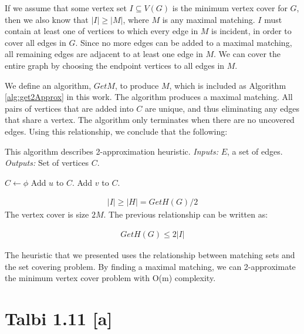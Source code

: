 \documentclass[12pt]{article}
\begin{document}
If we assume that some vertex set $I \subseteq V(G)$ is the minimum vertex cover for $G$, then we also know that $|I| \geq |M|$, where $M$ is any maximal matching. $I$ must contain at least one of vertices to which every edge in $M$ is incident, in order to cover all edges in $G$. Since no more edges can be added to a maximal matching, all remaining edges are adjacent to at least one edge in $M$. We can cover the entire graph by choosing the endpoint vertices to all edges in $M$.

We define an algorithm, $GetM$, to produce $M$, which is included as Algorithm \ref{alg:get2Approx} in this work. The algorithm produces a maximal matching. All pairs of vertices that are added into $C$ are unique, and thus eliminating any edges that share a vertex. The algorithm only terminates when there are no uncovered edges. Using this relationship, we conclude that the following:


\begin{algorithm}[ht!]
	\caption{This algorithm describes 2-approximation heuristic. \textit{Inputs:} $E$, a set of edges.
		\textit{Outputs:} Set of vertices $C$.} 
	\begin{algorithmic}[1]
		
		
		\State $C \gets \phi$ 
		 
		\State Add $u$ to $C$.
		\State Add $v$ to $C$.
		\EndWhile
		\EndProcedure
		
	\end{algorithmic}	
	\label{alg:get2Approx}
\end{algorithm}



\begin{align*}
|I|  \geq |H| = GetH(G) / 2
\end{align*}
The vertex cover is size $2M$. The previous relationship can be written as:

\begin{align*}
GetH(G) \leq 2 |I|
\end{align*}

The heuristic that we presented uses the relationship between matching sets and the set covering problem. By finding a maximal matching, we can 2-approximate the minimum vertex cover problem with O(m) complexity.



\section{Talbi 1.11 [a]}
\end{document}
